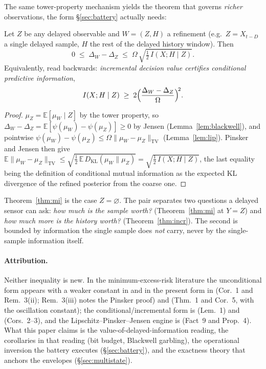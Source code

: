 \documentclass[acmsmall,screen,review,anonymous]{acmart}
\newcommand{\TV}{\mathrm{TV}}
\newcommand{\KL}{D_{\mathrm{KL}}}
\newcommand{\E}{\mathbb{E}}
\begin{document}
The same tower-property mechanism yields the theorem that governs
\emph{richer} observations, the form \S\ref{sec:battery} actually needs:

\begin{theorem}\label{thm:incr}
Let $Z$ be any delayed observable and $W=(Z,H)$ a refinement (e.g.\
$Z=X_{t-D}$ a single delayed sample, $H$ the rest of the delayed history
window). Then
\[
0\;\le\;\Delta_W-\Delta_Z\;\le\;\Omega\,
\sqrt{\tfrac12\,I(X;H\mid Z)} .
\]
Equivalently, read backwards:
\emph{incremental decision value certifies conditional predictive
information},
\[
I(X;H\mid Z)\;\ge\;2\Bigl(\frac{\Delta_W-\Delta_Z}{\Omega}\Bigr)^{\!2}.
\]
\end{theorem}

\begin{proof}
$\mu_Z=\E[\mu_W\mid Z]$ by the tower property, so
$\Delta_W-\Delta_Z=\E[\psi(\mu_W)-\psi(\mu_Z)]\ge0$ by Jensen
(Lemma~\ref{lem:blackwell}), and pointwise
$\psi(\mu_W)-\psi(\mu_Z)\le\Omega\|\mu_W-\mu_Z\|_{\TV}$
(Lemma~\ref{lem:lip}). Pinsker and Jensen then give
$\E\|\mu_W-\mu_Z\|_{\TV}
\le\sqrt{\tfrac12\,\E\,\KL(\mu_W\|\mu_Z)}
=\sqrt{\tfrac12\,I(X;H\mid Z)}$,
the last equality being the definition of conditional mutual information as
the expected KL divergence of the refined posterior from the coarse one.
\end{proof}

Theorem~\ref{thm:mi} is the case $Z=\varnothing$. The pair separates two
questions a delayed sensor can ask: \emph{how much is the sample worth?}
(Theorem~\ref{thm:mi} at $Y=Z$) and \emph{how much more is the history
worth?} (Theorem~\ref{thm:incr}). The second is bounded by
information the single sample does \emph{not} carry, never by the
single-sample information itself.

\paragraph{Attribution.} Neither inequality is new. In the
minimum-excess-risk literature the unconditional form appears with a
weaker constant in \cite{makhdoumi14} and in the present form in
\cite{gyorfi23} (Cor.~1 and Rem.~3(ii); Rem.~3(iii) notes the Pinsker
proof) and \cite{xu20} (Thm.~1 and Cor.~5, with the oscillation constant); the
conditional/incremental form is \cite{hafezkolahi21} (Lem.~1) and
\cite{xuraginsky22} (Cors.~2--3), and the Lipschitz--Pinsker--Jensen
engine is \cite{russo16} (Fact~9 and Prop.~4). What this paper claims is
the value-of-delayed-information reading, the corollaries in that reading
(bit budget, Blackwell garbling), the operational inversion the battery
executes (\S\ref{sec:battery}), and the exactness theory that anchors
the envelopes (\S\ref{sec:multistate}).
\end{document}
